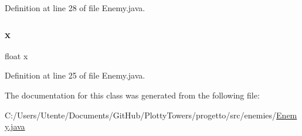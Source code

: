 Definition at line 28 of file Enemy.\+java.

\mbox{\label{classenemies_1_1_enemy_ad0da36b2558901e21e7a30f6c227a45e}} 
\subsubsection{\texorpdfstring{x}{x}}
{\footnotesize\ttfamily float x\hspace{0.3cm}{\ttfamily [private]}}



Definition at line 25 of file Enemy.\+java.



The documentation for this class was generated from the following file\+:\begin{DoxyCompactItemize}
\item 
C\+:/\+Users/\+Utente/\+Documents/\+Git\+Hub/\+Plotty\+Towers/progetto/src/enemies/\hyperlink{_enemy_8java}{Enemy.\+java}\end{DoxyCompactItemize}
